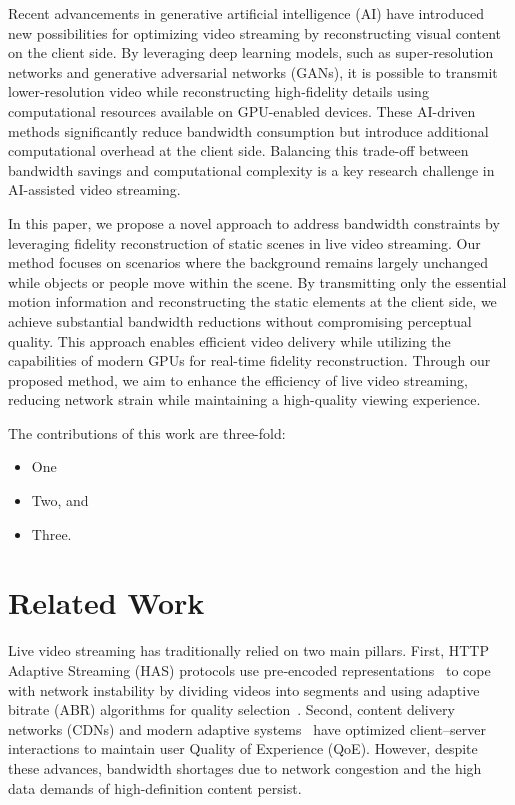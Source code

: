 Recent advancements in generative artificial intelligence (AI) have introduced new possibilities for optimizing video streaming by reconstructing visual content on the client side. By leveraging deep learning models, such as super-resolution networks and generative adversarial networks (GANs), it is possible to transmit lower-resolution video while reconstructing high-fidelity details using computational resources available on GPU-enabled devices. These AI-driven methods significantly reduce bandwidth consumption but introduce additional computational overhead at the client side. Balancing this trade-off between bandwidth savings and computational complexity is a key research challenge in AI-assisted video streaming.

In this paper, we propose a novel approach to address bandwidth constraints by leveraging fidelity reconstruction of static scenes in live video streaming. Our method focuses on scenarios where the background remains largely unchanged while objects or people move within the scene. By transmitting only the essential motion information and reconstructing the static elements at the client side, we achieve substantial bandwidth reductions without compromising perceptual quality. This approach enables efficient video delivery while utilizing the capabilities of modern GPUs for real-time fidelity reconstruction. Through our proposed method, we aim to enhance the efficiency of live video streaming, reducing network strain while maintaining a high-quality viewing experience.

The contributions of this work are three-fold:

\begin{itemize}
    \item One
    \item Two, and
    \item Three.
\end{itemize}

\newpage

\section{Related Work}
Live video streaming has traditionally relied on two main pillars. 
First, HTTP Adaptive Streaming (HAS) protocols use pre‐encoded representations~\cite{AVC, HEVC, AV1, VVC} to cope with network instability by dividing videos into segments and using adaptive bitrate (ABR) algorithms for quality selection~\cite{Wiegand et al. 2003, Sullivan et al. 2012}. 
Second, content delivery networks (CDNs) and modern adaptive systems~\cite{Pensieve} have optimized client–server interactions to maintain user Quality of Experience (QoE). 
However, despite these advances, bandwidth shortages due to network congestion and the high data demands of high-definition content persist.

